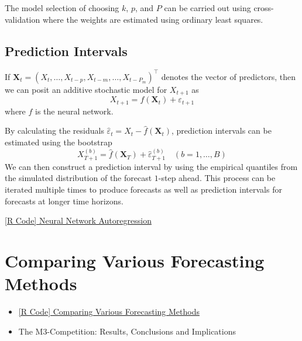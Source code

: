 The model selection of choosing $ k $, $ p $, and $ P $
can be carried out using cross-validation where the weights are estimated using ordinary
least squares.

\subsection*{Prediction Intervals}
If $ \symbf{X}_t=(X_t,\ldots,X_{t-p},X_{t-m},\ldots,X_{t-P_m})^\top $
denotes the vector of predictors, then we can posit an additive stochastic model for
$ X_{t+1} $ as
\[ X_{t+1}=f(\symbf{X}_t)+\varepsilon_{t+1} \]
where $ f $ is the neural network.

By calculating the residuals
$ \hat{\varepsilon}_t=X_t-\hat{f}(\symbf{X}_t) $,
prediction intervals can be estimated using the bootstrap
\[ X_{T+1}^{(b)}=\hat{f}(\symbf{X}_T)+\hat{\varepsilon}_{T+1}^{(b)}\quad(b=1,\ldots,B) \]
We can then construct a prediction interval by using
the empirical quantiles from the simulated distribution of the
forecast $ 1 $-step ahead. This process can be iterated multiple
times to produce forecasts as well as prediction intervals for
forecasts at longer time horizons.

\href{https://github.com/Hextical/university-notes/blob/master/year-3/semester-2/STAT 443/code/8.1 - Neural Network Autoregression.R}{[R Code] Neural Network Autoregression}
\section{Comparing Various Forecasting Methods}
\begin{itemize}
    \item \href{https://github.com/Hextical/university-notes/blob/master/year-3/semester-2/STAT 443/code/8.2 - Comparing Various Forecasting Methods.R}{[R Code] Comparing Various Forecasting Methods}
    \item The M3-Competition: Results, Conclusions and Implications
\end{itemize}
